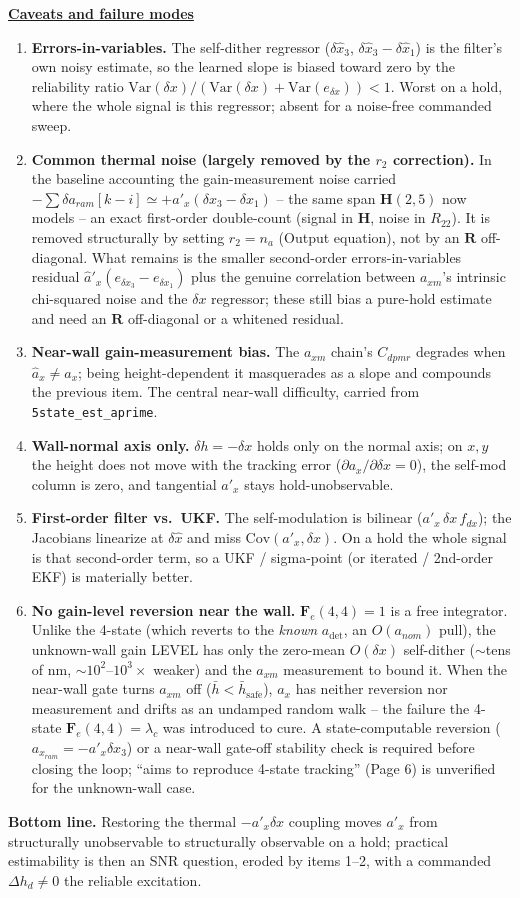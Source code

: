 \documentclass[11pt,a4paper,fontset=none]{ctexart}
\newcommand{\lc}{\lambda_c}
\newcommand{\dxh}{\delta\hat x}
\newcommand{\hd}[1]{\par\medskip\noindent\underline{\textbf{#1}}\par\nobreak\vspace{0.4ex}}
\begin{document}
\hd{Caveats and failure modes}
\begin{enumerate}[leftmargin=1.6em,itemsep=4pt]
\item \textbf{Errors-in-variables.} The self-dither regressor ($\dxh_3$, $\dxh_3-\dxh_1$) is the filter's own noisy estimate, so the learned slope is biased toward zero by the reliability ratio $\mathrm{Var}(\delta x)/(\mathrm{Var}(\delta x)+\mathrm{Var}(e_{\delta x}))<1$. Worst on a hold, where the whole signal is this regressor; absent for a noise-free commanded sweep.
\item \textbf{Common thermal noise (largely removed by the $r_2$ correction).} In the baseline accounting the gain-measurement noise carried $-\sum\delta a_{ram}[k-i]\simeq +a'_x(\delta x_3-\delta x_1)$ -- the same span $\mathbf H(2,5)$ now models -- an exact first-order double-count (signal in $\mathbf H$, noise in $R_{22}$). It is removed structurally by setting $r_2=n_a$ (Output equation), not by an $\mathbf R$ off-diagonal. What remains is the smaller second-order errors-in-variables residual $\hat a'_x(e_{\delta x_3}-e_{\delta x_1})$ plus the genuine correlation between $a_{xm}$'s intrinsic chi-squared noise and the $\delta x$ regressor; these still bias a pure-hold estimate and need an $\mathbf R$ off-diagonal or a whitened residual.
\item \textbf{Near-wall gain-measurement bias.} The $a_{xm}$ chain's $C_{dpmr}$ degrades when $\hat a_x\neq a_x$; being height-dependent it masquerades as a slope and compounds the previous item. The central near-wall difficulty, carried from \texttt{5state\_est\_aprime}.
\item \textbf{Wall-normal axis only.} $\delta h=-\delta x$ holds only on the normal axis; on $x,y$ the height does not move with the tracking error ($\partial a_x/\partial\delta x=0$), the self-mod column is zero, and tangential $a'_x$ stays hold-unobservable.
\item \textbf{First-order filter vs.\ UKF.} The self-modulation is bilinear ($a'_x\,\delta x\,f_{dx}$); the Jacobians linearize at $\dxh$ and miss $\mathrm{Cov}(a'_x,\delta x)$. On a hold the whole signal is that second-order term, so a UKF / sigma-point (or iterated / 2nd-order EKF) is materially better.
\item \textbf{No gain-level reversion near the wall.} $\mathbf F_e(4,4)=1$ is a free integrator. Unlike the 4-state (which reverts to the \textit{known} $a_{\det}$, an $O(a_{nom})$ pull), the unknown-wall gain LEVEL has only the zero-mean $O(\delta x)$ self-dither ($\sim$tens of nm, $\sim10^2$--$10^3\times$ weaker) and the $a_{xm}$ measurement to bound it. When the near-wall gate turns $a_{xm}$ off ($\bar h<\bar h_{\text{safe}}$), $a_x$ has neither reversion nor measurement and drifts as an undamped random walk -- the failure the 4-state $\mathbf F_e(4,4)=\lc$ was introduced to cure. A state-computable reversion ($a_{x_{ram}}=-a'_x\delta x_3$) or a near-wall gate-off stability check is required before closing the loop; ``aims to reproduce 4-state tracking'' (Page 6) is unverified for the unknown-wall case.
\end{enumerate}

\textbf{Bottom line.} Restoring the thermal $-a'_x\delta x$ coupling moves $a'_x$ from structurally unobservable to structurally observable on a hold; practical estimability is then an SNR question, eroded by items 1--2, with a commanded $\Delta h_d\neq0$ the reliable excitation.
\end{document}
